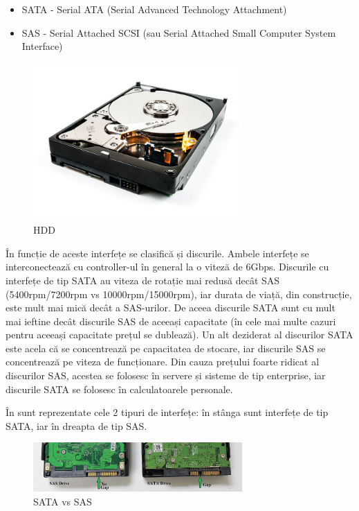 \begin{itemize}
	\item SATA - Serial ATA  (Serial Advanced Technology Attachment)
	\item SAS - Serial Attached SCSI  (sau
		Serial Attached Small Computer System Interface)
\end{itemize}

\begin{figure}[!htbp]
	\centering
	\includegraphics[width=8cm]{chapters/10-storage/img/hdd-img.png}
	\caption{HDD\protect\footnotemark}
	\label{fig:storage-hdd}
\end{figure}


În funcție de aceste interfețe se clasifică și discurile. Ambele interfețe se
interconectează cu controller-ul în general la o viteză de 6Gbps. Discurile cu
interfețe de tip SATA au viteza de rotație mai redusă decât SAS (5400rpm/7200rpm
vs 10000rpm/15000rpm), iar durata de viață, din construcție, este mult mai mică
decât a SAS-urilor. De aceea discurile SATA sunt cu mult mai ieftine decât
discurile SAS de aceeași capacitate (în cele mai multe cazuri pentru aceeași
capacitate prețul se dublează). Un alt deziderat al discurilor SATA este acela
că se concentrează pe capacitatea de stocare, iar discurile SAS se concentrează
pe viteza de funcționare. Din cauza prețului foarte ridicat al discurilor SAS,
acestea se folosesc în servere și sisteme de tip enterprise, iar discurile SATA
se folosesc în calculatoarele personale.

În  sunt reprezentate cele 2 tipuri
de interfețe: în stânga sunt interfețe de tip SATA, iar în dreapta de tip SAS.

\begin{figure}[!htbp]
	\centering
	\includegraphics[width=8cm]{chapters/10-storage/img/sas-sata-img.png}
	\caption{SATA vs SAS\protect\footnotemark}
	\label{fig:storage-sas-sata}
\end{figure}

